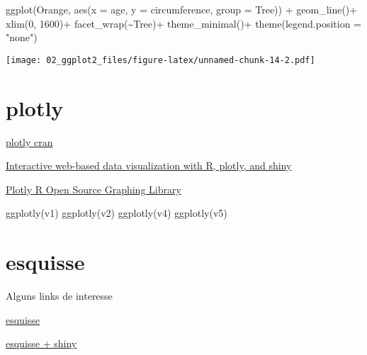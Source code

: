 \documentclass[
]{book}
\newenvironment{Shaded}{\begin{snugshade}}{\end{snugshade}}
\newcommand{\AttributeTok}[1]{\textcolor[rgb]{0.77,0.63,0.00}{#1}}
\newcommand{\DecValTok}[1]{\textcolor[rgb]{0.00,0.00,0.81}{#1}}
\newcommand{\FunctionTok}[1]{\textcolor[rgb]{0.00,0.00,0.00}{#1}}
\newcommand{\NormalTok}[1]{#1}
\newcommand{\SpecialCharTok}[1]{\textcolor[rgb]{0.00,0.00,0.00}{#1}}
\newcommand{\StringTok}[1]{\textcolor[rgb]{0.31,0.60,0.02}{#1}}
\begin{document}
\begin{Shaded}
\begin{Highlighting}[]
\FunctionTok{ggplot}\NormalTok{(Orange, }\FunctionTok{aes}\NormalTok{(}\AttributeTok{x =}\NormalTok{ age, }\AttributeTok{y =}\NormalTok{ circumference, }\AttributeTok{group =}\NormalTok{ Tree)) }\SpecialCharTok{+}
  \FunctionTok{geom\_line}\NormalTok{()}\SpecialCharTok{+}
  \FunctionTok{xlim}\NormalTok{(}\DecValTok{0}\NormalTok{, }\DecValTok{1600}\NormalTok{)}\SpecialCharTok{+}
  \FunctionTok{facet\_wrap}\NormalTok{(}\SpecialCharTok{\textasciitilde{}}\NormalTok{Tree)}\SpecialCharTok{+}
  \FunctionTok{theme\_minimal}\NormalTok{()}\SpecialCharTok{+}
  \FunctionTok{theme}\NormalTok{(}\AttributeTok{legend.position =} \StringTok{"none"}\NormalTok{)}
\end{Highlighting}
\end{Shaded}

\texttt{[image: 02\_ggplot2\_files/figure-latex/unnamed-chunk-14-2.pdf]}

\hypertarget{plotly}{%
\section{plotly}\label{plotly}}

\href{https://cran.r-project.org/web/packages/plotly/index.html}{plotly cran}

\href{https://plotly-r.com/}{Interactive web-based data visualization with R, plotly, and shiny}

\href{https://plotly.com/r/}{Plotly R Open Source Graphing Library}

\begin{Shaded}
\begin{Highlighting}[]
\FunctionTok{ggplotly}\NormalTok{(v1)}
\FunctionTok{ggplotly}\NormalTok{(v2)}
\FunctionTok{ggplotly}\NormalTok{(v4)}
\FunctionTok{ggplotly}\NormalTok{(v5)}
\end{Highlighting}
\end{Shaded}

\hypertarget{esquisse}{%
\section{esquisse}\label{esquisse}}

Alguns links de interesse

\href{https://cran.r-project.org/web/packages/esquisse/vignettes/get-started.html}{esquisse}

\href{https://cran.r-project.org/web/packages/esquisse/vignettes/shiny-usage.html}{esquisse + shiny}
\end{document}
